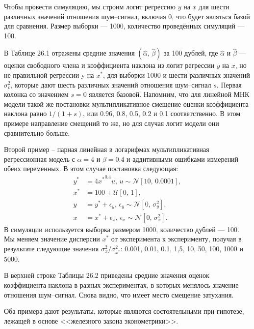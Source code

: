 Чтобы провести симуляцию, мы строим логит регрессию $y$ на $x$ для шести различных значений отношения шум--сигнал, включая 0, что будет являться базой для сравнения. Размер выборки --- 1000, количество проведённых симуляций --- 100. 

В Таблице 26.1 отражены средние значения $(\widehat{\alpha}, \, \widehat{\beta})$ за 100 дублей, где $\widehat{\alpha}$ и $\widehat{\beta}$ --- оценки свободного члена и коэффициента наклона из логит регрессии $y$ на $x$, но не правильной регрессии y на $x^*$, для выборки 1000 и шести различных значений $\sigma^2_v$, которые дают шесть различных значений отношения шум--сигнал $s$. Первая колонка со значением $s=0$ является базовой. Напомним, что для линейной МНК модели такой же постановки  мультипликативное смещение оценки коэффициента наклона равно $1/(1+s)$, или 0.96, 0.8, 0.5, 0.2 и 0.1 соответственно. В этом примере  направление смещений то же, но для случая логит модели они сравнительно больше.

Второй пример – парная линейная в логарифмах мультипликативная регрессионная модель с $\alpha=4$ и $\beta=0.4$ и аддитивными ошибками измерений обеих переменных. В этом случае постановка следующая:
\begin{align*}
y^* &= 4{x^*}^{0.4}u, \, u \sim \mathcal{N}[10, \, 0.0001], \\
x^* &= 100+ \mathcal{U}[0, \, 1], \\
y &= y^*+ \epsilon_y, \, \epsilon_y \sim \mathcal{N}[0, \, \sigma^2_y], \\
x &= x^*+ \epsilon_x, \, \epsilon_x \sim \mathcal{N}[0, \, \sigma^2_x].
\end{align*}
В симуляции используется выборка размером 1000, количество дублей --- 100. Мы меняем значение дисперсии $x^*$ от эксперимента к эксперименту, получая в результате следующие значения $\sigma^2_{x} / \sigma^2_{x^*}$: 0.001, 0.01, 0.1, 1,5, 10, 50, 100, 1000 и 5000.

В верхней строке Таблицы 26.2 приведены средние значения оценок коэффициента наклона в разных экспериментах, в которых менялось значение отношения шум--сигнал. Снова видно, что имеет место смещение затухания.

Оба примера дают результаты, которые являются состоятельными при гипотезе, лежащей в основе <<железного закона эконометрики>>.

